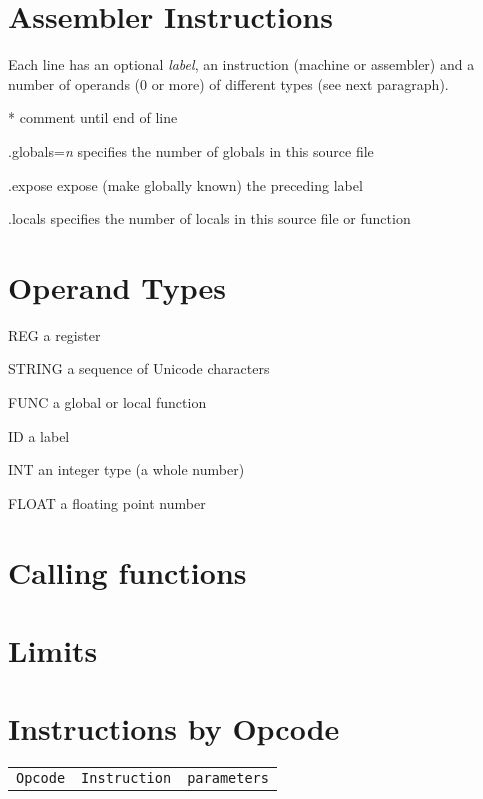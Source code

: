 \documentclass[10pt]{article}
\begin{document}
\begin{multicols}{3}
\section{ Assembler Instructions}
Each line has an optional \emph{label}, an instruction (machine or
assembler) and a number of operands (0 or more) of different types
(see next paragraph).

\begin{ttdesc}[labelwidth=\widthof{\ttfamily{letterpaper/a4paper}}]
\item[*]  comment until end of line
\item[.globals=\emph{n}] specifies the number of globals in this
  source file
\item[.expose] expose (make globally known) the preceding label
\item[.locals]  specifies the number of locals in this source file or
  function
\end{ttdesc}


\section{ Operand Types}
\begin{ttdesc}[labelwidth=\widthof{\ttfamily{letterpaper/a4paper}}]
\item[REG] a register
\item[STRING] a sequence of Unicode characters
\item[FUNC] a global or local function
\item[ID] a label
\item[INT] an integer type (a whole number)
\item[FLOAT] a floating point number
\end{ttdesc}



\section{ Calling functions}
\section{ Limits}
\pagebreak
\section{ Instructions by Opcode}
\begin{supertabular}{|lll|}
  \texttt{Opcode} & \texttt{Instruction} & \texttt{parameters} \\

\end{supertabular}


\end{multicols}
\end{document}
